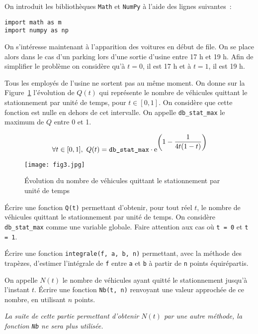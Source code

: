 On introduit les bibliothèques \texttt{Math} et \texttt{NumPy} à l'aide des lignes suivantes~:
\begin{lstlisting}
import math as m
import numpy as np
\end{lstlisting}


On s'intéresse maintenant à l'apparition des voitures en début de file. On se place alors dans le cas d'un parking lors d'une sortie d'usine entre 17 h et 19 h. Afin de simplifier le problème on considère qu'à $t=0$, il est 17 h et à $t=1$, il est 19 h.

Tous les employés de l'usine ne sortent pas au même moment.  On donne sur la Figure~\ref{f_quitte_stat} l'évolution de $Q(t)$ qui représente le nombre de véhicules quittant le stationnement par unité de temps, pour $t\in[0,1]$. On considère que cette fonction est nulle en dehors de cet intervalle. On appelle \texttt{db\_stat\_max} le maximum de $Q$ entre 0 et 1.

\[ \forall t\in[0,1],\ Q(t)=\mbox{\texttt{db\_stat\_max}}\cdot \mathrm e^{\left(\displaystyle 1-\frac{1}{4t(1-t)}\right)}\]

\begin{figure}[!htb]
\begin{center}
\texttt{[image: fig3.jpg]}
\caption{\label{f_quitte_stat} Évolution du nombre de véhicules quittant le stationnement par unité de temps}
\end{center}
\end{figure}


\question{} \'Ecrire une fonction \texttt{Q(t)} permettant d'obtenir, pour tout réel $t$, le nombre de véhicules quittant le stationnement par unité de temps. On considère \texttt{db\_stat\_max} comme une variable globale. Faire attention aux cas où \texttt{t = 0} et \texttt{t = 1}. 

\question{} \' Ecrire une fonction \texttt{integrale(f, a, b, n)} permettant,  avec la méthode des trapèzes, d'estimer l'intégrale de \texttt{f} entre \texttt{a} et \texttt{b} à partir de \texttt{n} points équirépartis.

\question{} On appelle $N(t)$ le nombre de véhicules ayant quitté le stationnement jusqu'à l'instant $t$. \'Ecrire une fonction \texttt{Nb(t, n)} renvoyant une valeur approchée de ce nombre, en utilisant $n$ points. 
	
\emph{La suite de cette partie permettant d'obtenir $N(t)$ par une autre méthode, la fonction \texttt{Nb} ne sera plus utilisée.}


